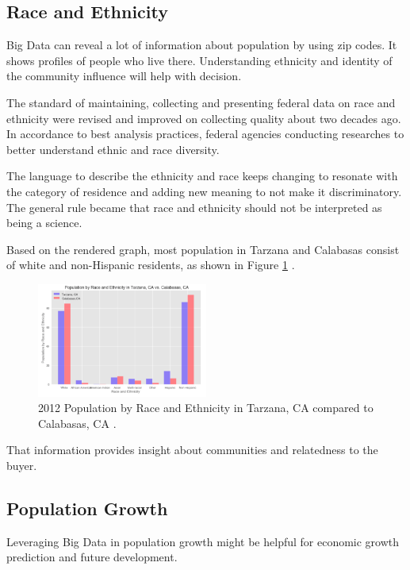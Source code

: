 \documentclass[sigconf]{acmart}
\begin{document}
\subsection{Race and Ethnicity}

Big Data can reveal a lot of information about population by using zip codes. It shows profiles of people who live there. 
Understanding ethnicity and identity of the community influence will help with decision.

The standard of maintaining, collecting and presenting federal data on race and ethnicity \cite{race} were revised and improved on collecting quality about two decades ago. In accordance to best analysis practices, federal agencies conducting researches to better understand ethnic and race diversity.

The language to describe the ethnicity and race keeps changing to resonate with the category of residence and adding new meaning to not make it discriminatory.  The general rule became that race and ethnicity should not be interpreted as being a science. 

Based on the rendered graph, most population in Tarzana and Calabasas consist of white and non-Hispanic residents, as shown in Figure \ref{fig:figure5} \cite{md}.

\begin{figure}
  \centering
  \includegraphics[width=0.5\textwidth]{images/figure5.png}
  \caption{2012 Population by Race and Ethnicity in Tarzana, CA compared to Calabasas, CA \cite{md}.} \label{fig:figure5} 
\end{figure}

That information provides insight about communities and relatedness to the buyer.

\subsection{Population Growth}

Leveraging Big Data in population growth might be helpful for economic growth prediction and future development.
\end{document}
